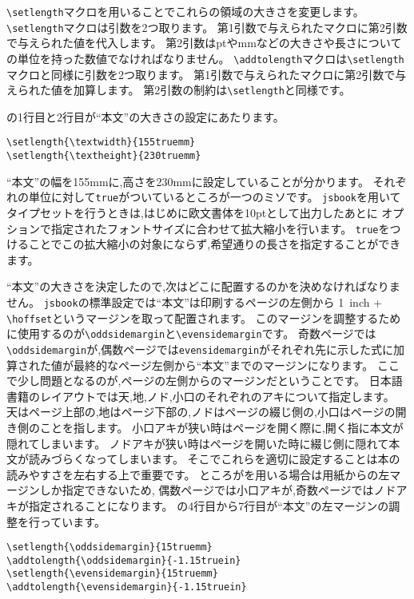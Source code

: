 \verb|\setlength|マクロを用いることでこれらの領域の大きさを変更します。
\verb|\setlength|マクロは引数を2つ取ります。
第1引数で与えられたマクロに第2引数で与えられた値を代入します。
第2引数はptやmmなどの大きさや長さについての単位を持った数値でなければなりません。
\verb|\addtolength|マクロは\verb|\setlength|マクロと同様に引数を2つ取ります。
第1引数で与えられたマクロに第2引数で与えられた値を加算します。
第2引数の制約は\verb|\setlength|と同様です。

の1行目と2行目が``本文''の大きさの設定にあたります。
\begin{verbatim}
\setlength{\textwidth}{155truemm}
\setlength{\textheight}{230truemm}
\end{verbatim}
``本文''の幅を155mmに,高さを230mmに設定していることが分かります。
それぞれの単位に対して\texttt{true}がついているところが一つのミソです。
\texttt{jsbook}を用いてタイプセットを行うときは,はじめに欧文書体を10ptとして出力したあとに
オプションで指定されたフォントサイズに合わせて拡大縮小を行います。
\texttt{true}をつけることでこの拡大縮小の対象にならず,希望通りの長さを指定することができます。

``本文''の大きさを決定したので,次はどこに配置するのかを決めなければなりません。
\texttt{jsbook}の標準設定では``本文''は印刷するページの左側から
1\ inch + \verb|\hoffset|というマージンを取って配置されます。
このマージンを調整するために使用するのが\verb|\oddsidemargin|と\verb|\evensidemargin|です。
奇数ページでは\verb|\oddsidemargin|が,偶数ページでは\verb|evensidemargin|がそれぞれ先に示した式に加算された値が最終的なページ左側から``本文''までのマージンになります。
ここで少し問題となるのが,ページの左側からのマージンだということです。
日本語書籍のレイアウトでは天,地,ノド,小口のそれぞれのアキについて指定します。
天はページ上部の,地はページ下部の,ノドはページの綴じ側の,小口はページの開き側のことを指します。
小口アキが狭い時はページを開く際に,開く指に本文が隠れてしまいます。
ノドアキが狭い時はページを開いた時に綴じ側に隠れて本文が読みづらくなってしまいます。
そこでこれらを適切に設定することは本の読みやすさを左右する上で重要です。
ところが{\pLaTeX}を用いる場合は用紙からの左マージンしか指定できないため,
偶数ページでは小口アキが,奇数ページではノドアキが指定されることになります。
の4行目から7行目が``本文''の左マージンの調整を行っています。

\begin{verbatim}
\setlength{\oddsidemargin}{15truemm}
\addtolength{\oddsidemargin}{-1.15truein}
\setlength{\evensidemargin}{15truemm}
\addtolength{\evensidemargin}{-1.15truein}
\end{verbatim}

